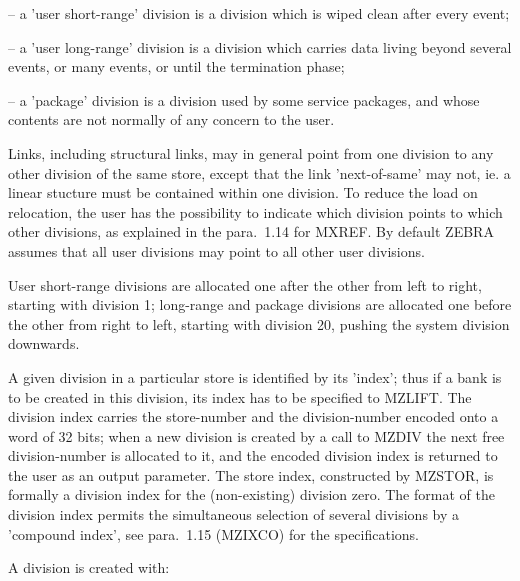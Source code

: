  -- a 'user short-range' division is a division which is
wiped clean after every event;

 -- a 'user long-range' division is a division which carries
data living beyond several events,
or many events,
or until the termination phase;

 -- a 'package' division is a division used by some service
packages,
and whose contents are not normally of any concern to the user.

Links, including structural links,
may in general point from one division to any other division
of the same store,
except that the link 'next-of-same' may not,
ie. a linear stucture must be contained within one division.
To reduce the load on relocation,
the user has the possibility to indicate which division points
to which other divisions,
as explained in the para.~1.14 for MXREF.
By default ZEBRA assumes that all user divisions may point
to all other user divisions.

User short-range divisions are allocated one after the other
from left to right, starting with division 1;
long-range and package divisions
are allocated one before the other from right to left,
starting with division 20, pushing the system division downwards.

A given division in a particular store is identified by its 'index';
thus if a bank is to be created in this division,
its index has to be specified to MZLIFT.
The division index carries the store-number and the division-number
encoded onto a word of 32 bits;
when a new division is created by a call to MZDIV the next free
division-number is allocated to it,
and the encoded division index is returned to the user as
an output parameter.
The store index, constructed by MZSTOR, is formally a division index
for the (non-existing) division zero.
The format of the division index permits the simultaneous selection
of several divisions by a 'compound index',
see para.~1.15 (MZIXCO) for the specifications.

A division is created with:


